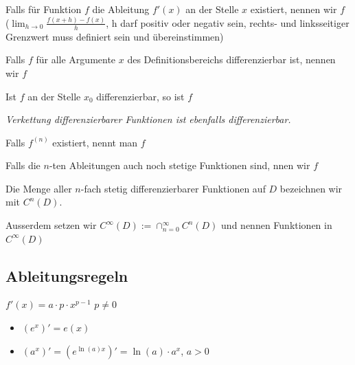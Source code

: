 Falls für Funktion $f$ die Ableitung $f'(x)$ an der Stelle $x$ existiert, nennen wir $f$ 
{\small \color{gray}($\lim_{h \rightarrow 0}\frac{f(x+h)-f(x)}{h}$, h darf positiv oder negativ sein, rechts- und linksseitiger Grenzwert muss definiert sein und übereinstimmen)}

Falls $f$ für alle Argumente $x$ des Definitionsbereichs differenzierbar ist, nennen wir $f$ 

Ist $f$ an der Stelle $x_0$ differenzierbar, so ist $f$ 

\textit{Verkettung differenzierbarer Funktionen ist ebenfalls differenzierbar.}

Falls $f^{(n)}$ existiert, nennt man $f$ 

Falls die $n$-ten Ableitungen auch noch stetige Funktionen sind, nnen wir $f$ 

Die Menge aller $n$-fach stetig differenzierbarer Funktionen auf $D$ bezeichnen wir mit $C^n(D)$.

Ausserdem setzen wir $C^\infty (D) := \cap_{n=0}^\infty C^n(D)$ und nennen Funktionen in $C^\infty (D)$ 


\subsection{Ableitungsregeln}

 $f'(x)=a \cdot p \cdot x^{p-1}$   $p \neq 0$

\begin{itemize}
    \item $(e^x)' = e(x)$
    \item $(a^x)' = (e^{\ln(a)x})' = \ln(a) \cdot a^x$, $a>0$
\end{itemize}

